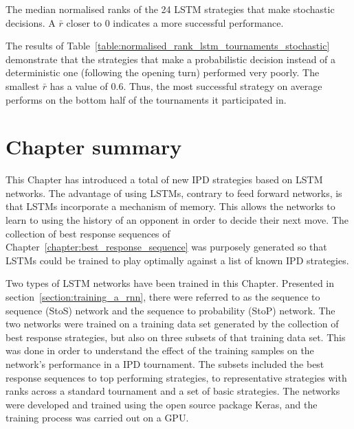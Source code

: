 \begin{table}[!htbp]
    \begin{center}
    \resizebox{.8\textwidth}{!}{
        
    }
\end{center}
\caption{The median normalised ranks of the 24 LSTM strategies that make stochastic
decisions. A \(\bar{r}\) closer to 0 indicates a more successful performance.}
\label{table:normalised_rank_lstm_tournaments_stochastic}
\end{table}

The results of Table~\ref{table:normalised_rank_lstm_tournaments_stochastic}
demonstrate that the strategies that make a probabilistic decision instead of a
deterministic one (following the opening turn) performed very poorly. The
smallest \(\bar{r}\) has a value of 0.6. Thus, the most successful strategy on
average performs on the bottom half of the tournaments it participated in.

\section{Chapter summary}

This Chapter has introduced a total of \lstmstrategies new IPD strategies based
on LSTM networks. The advantage of using LSTMs, contrary to feed forward networks,
is that LSTMs incorporate a mechanism of memory. This allows the networks
to learn to using the history of an opponent in order to decide their next move.
The collection of best response sequences of
Chapter~\ref{chapter:best_response_sequence} was purposely generated so that
LSTMs could be trained to play optimally against a list of known IPD strategies.

Two types of LSTM networks have been trained in this Chapter. Presented in
section~\ref{section:training_a_rnn}, there were referred to as the sequence to
sequence (StoS) network and the sequence to probability (StoP) network. The two
networks were trained on a training data set generated by the collection of best
response strategies, but also on three subsets of that training data set. This
was done in order to understand the effect of the training samples on the
network's performance in a IPD tournament. The subsets included the best
response sequences to top performing strategies, to representative strategies with ranks across
a standard tournament and a set of basic strategies. The networks were developed
and trained using the open source package Keras, and the training process was
carried out on a GPU.

